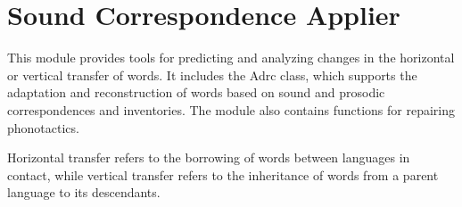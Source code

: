 \documentclass[letterpaper,10pt,english]{sphinxmanual}
\begin{document}
\begin{fulllineitems}
\begin{sphinxVerbatim}[commandchars=\\\{\}]
   
  
\end{sphinxVerbatim}

\end{fulllineitems}



\section{Sound Correspondence Applier}
\label{\detokenize{documentation:module-loanpy.scapplier}}\label{\detokenize{documentation:sound-correspondence-applier}}
\sphinxAtStartPar
This module provides tools for predicting and analyzing changes in the
horizontal or vertical transfer of words. It includes the
Adrc class, which supports the adaptation and reconstruction of words based
on sound and prosodic correspondences and inventories. The module also
contains functions for repairing phonotactics.

\sphinxAtStartPar
Horizontal transfer refers to the borrowing of words
between languages in contact, while vertical transfer refers to the
inheritance of words from a parent language to its descendants.
\end{document}
